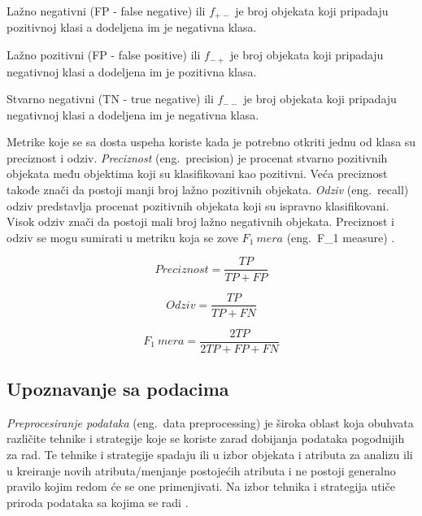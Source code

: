 \documentclass[12pt,oneside]{memoir}
\begin{document}
Lažno negativni (FP - false negative) ili $f_{+-}$ je broj objekata koji pripadaju pozitivnoj klasi a dodeljena im je negativna klasa.

Lažno pozitivni (FP - false positive) ili $f_{-+}$ je broj objekata koji pripadaju negativnoj klasi a dodeljena im je pozitivna klasa.

Stvarno negativni (TN - true negative) ili $f_{--}$ je broj objekata koji pripadaju negativnoj klasi a dodeljena im je negativna klasa.








Metrike koje se sa dosta uspeha koriste kada je potrebno otkriti jednu od klasa su preciznost i odziv. \textit{Preciznost} (eng.~precision) je procenat stvarno pozitivnih objekata među objektima koji su klasifikovani kao pozitivni. Veća preciznost takođe znači da postoji manji broj lažno pozitivnih objekata. \textit{Odziv} (eng.~recall) odziv predstavlja procenat pozitivnih objekata koji su ispravno klasifikovani. Visok odziv znači da postoji mali broj lažno negativnih objekata. Preciznost i odziv se mogu sumirati u metriku koja se zove $F_1\ mera$ (eng.~F\_1 measure)  \cite{mitic}.

$$ \textit{Preciznost} = \frac{TP}{TP+FP} $$

$$ \textit{Odziv} = \frac{TP}{TP+FN} $$ 

$$ F_1\ mera = \frac{2TP}{2TP+FP+FN}$$


\subsection{Upoznavanje sa podacima}  \label{upoznavanje}

\textit{Preprocesiranje podataka} (eng.~data preprocessing) je široka oblast koja obuhvata različite tehnike i strategije koje se koriste zarad dobijanja podataka pogodnijih za rad. Te tehnike i strategije spadaju ili u izbor objekata i atributa za analizu ili u kreiranje novih atributa/menjanje postojećih atributa i ne postoji generalno pravilo kojim redom će se one primenjivati. Na izbor tehnika i strategija utiče priroda podataka sa kojima se radi \cite{mitic}. 
\end{document}
